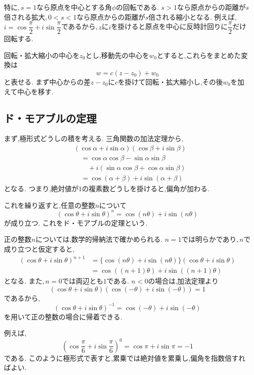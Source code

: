     特に,\,$s=1$なら原点を中心とする角$\phi$の回転である.
    $s>1$なら原点からの距離が$s$倍される拡大,\,$0<s<1$なら原点からの距離が$s$倍される縮小となる.
    例えば,\,$i=\cos\dfrac{\pi}{2}+i\sin\dfrac{\pi}{2}$であるから,\,$z$に$i$を掛けると原点を中心に反時計回りに$\dfrac{\pi}{2}$だけ回転する.

    回転・拡大縮小の中心を$z_0$とし,移動先の中心を$w_0$とすると,これらをまとめた変換は
    \[
      w=c(z-z_0)+w_0
    \]
    と表せる.
    まず中心からの差$z-z_0$に$c$を掛けて回転・拡大縮小し,その後$w_0$を加えて中心を移す.

  \subsection{ド・モアブルの定理}\label{節：ド・モアブルの定理}
    まず,極形式どうしの積を考える.
    三角関数の加法定理から,
    \begin{align*}
      &(\cos\alpha+i\sin\alpha)
       (\cos\beta+i\sin\beta)\\
      &\quad=
       \cos\alpha\cos\beta-\sin\alpha\sin\beta\\
      &\qquad
       +i(\sin\alpha\cos\beta+\cos\alpha\sin\beta)\\
      &\quad=
       \cos(\alpha+\beta)+i\sin(\alpha+\beta)
    \end{align*}
    となる.
    つまり,絶対値が$1$の複素数どうしを掛けると,偏角が加わる.

    これを繰り返すと,任意の整数$n$について
    \[
      (\cos\theta+i\sin\theta)^n
      =
      \cos(n\theta)+i\sin(n\theta)
    \]
    が成り立つ.
    これをド・モアブルの定理という.

    正の整数$n$については,数学的帰納法で確かめられる.
    $n=1$では明らかであり,\,$n$で成り立つと仮定すると,
    \begin{align*}
      (\cos\theta+i\sin\theta)^{n+1}
        &=
        \{\cos(n\theta)+i\sin(n\theta)\}
        (\cos\theta+i\sin\theta)\\
        &=
        \cos((n+1)\theta)+i\sin((n+1)\theta)
    \end{align*}
    となる.
    また,\,$n=0$では両辺とも$1$である.
    $n<0$の場合は,加法定理より
    \[
      (\cos\theta+i\sin\theta)
      (\cos(-\theta)+i\sin(-\theta))=1
    \]
    であるから,
    \[
      (\cos\theta+i\sin\theta)^{-1}
      =
      \cos(-\theta)+i\sin(-\theta)
    \]
    を用いて正の整数の場合に帰着できる.

    例えば,
    \[
      \left(
        \cos\frac{\pi}{6}
        +i\sin\frac{\pi}{6}
      \right)^6
      =
      \cos\pi+i\sin\pi
      =
      -1
    \]
    である.
    このように極形式で表すと,累乗では絶対値を累乗し,偏角を指数倍すればよい.

